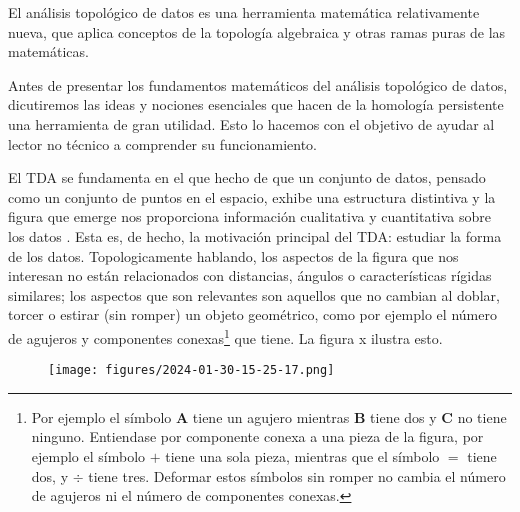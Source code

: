 \documentclass[a4paper,11pt]{article}
\begin{document}
El análisis topológico de  datos es una herramienta matemática relativamente nueva, que aplica conceptos de la topología algebraica y otras ramas puras de las matemáticas.

Antes de presentar los fundamentos matemáticos del análisis topológico de datos, dicutiremos las ideas y nociones esenciales que hacen de la homología persistente una herramienta de gran utilidad. Esto lo hacemos con el objetivo de  ayudar al lector no técnico a comprender su funcionamiento.

El TDA se fundamenta en el que hecho de que un conjunto de datos, pensado como un conjunto de puntos en el espacio, exhibe una estructura distintiva y  la figura que emerge  nos proporciona información cualitativa y cuantitativa sobre los datos \cite{chazal21}.
Esta es, de hecho, la motivación principal del TDA:  estudiar la forma de los datos.
Topologicamente hablando, los aspectos de la figura que nos interesan no están relacionados con distancias, ángulos  o características rígidas similares; los aspectos que son relevantes son aquellos que no cambian al doblar, torcer o estirar (sin romper) un objeto geométrico, como por ejemplo el número de agujeros y componentes conexas\footnote{Por ejemplo el símbolo \(\mathbf{A}\) tiene un agujero mientras \(\mathbf{B}\) tiene dos y \(\mathbf{C}\) no tiene ninguno. Entiendase por componente conexa a una pieza de la figura, por ejemplo el símbolo \(+\) tiene una sola pieza, mientras que el símbolo \(=\) tiene dos, y \(\div\) tiene tres. Deformar estos símbolos sin romper no cambia el número de agujeros ni el número de componentes conexas.} que tiene. La figura x ilustra esto.

\begin{figure}[!htb]
    \centering
    \texttt{[image: figures/2024-01-30-15-25-17.png]}
    \caption{}%
\end{figure}
\end{document}
